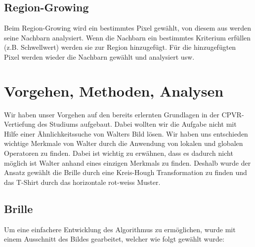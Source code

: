 \documentclass[paper=a4,fontsize=12pt]{scrartcl}
\begin{document}
\subsection*{Region-Growing}
Beim Region-Growing wird ein bestimmtes Pixel gewählt, von diesem aus werden seine Nachbarn analysiert. Wenn die Nachbarn ein bestimmtes Kriterium erfüllen (z.B. Schwellwert) werden sie zur Region hinzugefügt. Für die hinzugefügten Pixel werden wieder die Nachbarn gewählt und analysiert usw.
\newpage
\section*{Vorgehen, Methoden, Analysen}
Wir haben unser Vorgehen auf den bereits erlernten Grundlagen in der CPVR-Vertiefung des Studiums aufgebaut. Dabei wollten wir die Aufgabe nicht mit Hilfe einer Ähnlichkeitssuche von Walters Bild lösen. Wir haben uns entschieden wichtige Merkmale von Walter durch die Anwendung von lokalen und globalen Operatoren zu finden. Dabei ist wichtig zu erwähnen, dass es dadurch nicht möglich ist Walter anhand eines einzigen Merkmals zu finden. Deshalb wurde der Ansatz gewählt die Brille durch eine Kreis-Hough Transformation zu finden und das T-Shirt durch das horizontale rot-weiss Muster.
\subsection*{Brille}
Um eine einfachere Entwicklung des Algorithmus zu ermöglichen, wurde mit einem Ausschnitt des Bildes gearbeitet, welcher wie folgt gewählt wurde:
\end{document}
